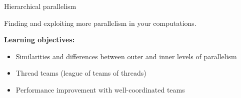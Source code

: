 \begin{frame}[fragile]

  {\Huge Hierarchical parallelism}

  \vspace{10pt}

  {\large Finding and exploiting more parallelism in your computations.}

  \vspace{20pt}

  \textbf{Learning objectives:}
  \begin{itemize}
    \item {Similarities and differences between outer and inner levels of parallelism}
    \item {Thread teams (league of teams of threads)}
    \item {Performance improvement with well-coordinated teams}
  \end{itemize}

  \vspace{-20pt}

\end{frame}


